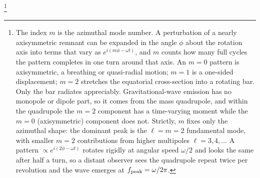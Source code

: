 %

\footnote{%
The index $m$ is the azimuthal mode number.
A perturbation of a nearly axisymmetric remnant can be expanded in the angle $\phi$ about the rotation axis into terms that vary as $e^{i(m\phi-\omega t)}$, and $m$ counts how many full cycles the pattern completes in one turn around that axis.
An $m=0$ pattern is axisymmetric, a breathing or quasi-radial motion; $m=1$ is a one-sided displacement; $m=2$ stretches the equatorial cross-section into a rotating bar.
Only the bar radiates appreciably.
Gravitational-wave emission has no monopole or dipole part, so it comes from the mass quadrupole, and within the quadrupole the $m=2$ component has a time-varying moment while the $m=0$ (axisymmetric) component does not.
Strictly, $m$ fixes only the azimuthal shape: the dominant peak is the $\ell=m=2$ fundamental mode, with smaller $m=2$ contributions from higher multipoles $\ell=3,4,\dots$
A pattern $\propto e^{i(2\phi-\omega t)}$ rotates rigidly at angular speed $\omega/2$ and looks the same after half a turn, so a distant observer sees the quadrupole repeat twice per revolution and the wave emerges at $f_{\rm peak}=\omega/2\pi$.%
}
